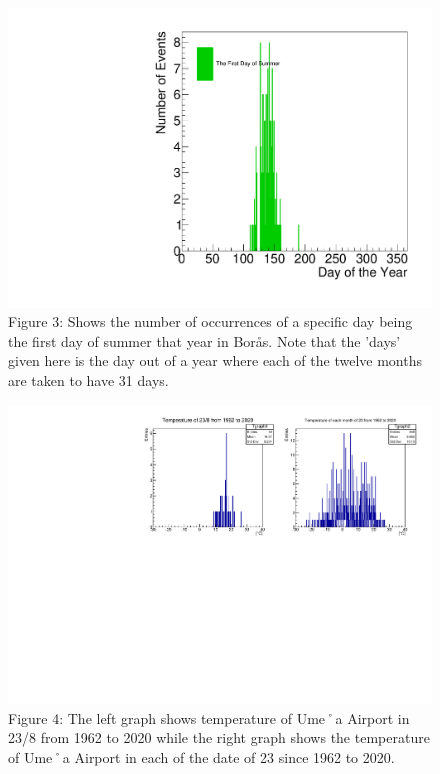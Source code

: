 \documentclass[a4, 12pt]{article}
\begin{document}
\begin{figure}[H]
\centering
\includegraphics[scale=0.45]{philipSummer.pdf}
\caption*{Figure 3: Shows the number of occurrences of a specific day being the first day of summer that year in Borås. Note that the 'days' given here is the day out of a year where each of the twelve months are taken to have 31 days.}
\end{figure}
\newpage






\begin{figure}[H]
\centering
\includegraphics[scale=0.5]{chrisFig4.pdf}
 \caption*{Figure 4: The left graph shows temperature of Ume˚a Airport in 23/8 from 1962 to 2020 while the right graph shows the temperature of Ume˚a Airport in each of the date of 23 since 1962 to 2020.}

\end{figure}
\end{document}
